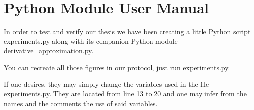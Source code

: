 \section{Python Module User Manual}

In order to test and verify our thesis we have been creating
a little Python script experiments.py along with its
companion Python module derivative\_approximation.py.

You can recreate all those figures in our protocol, just run experiments.py.

If one desires, they may simply change the variables used in the file experiments.py.
They are located from line 13 to 20 and one may infer from the names and the comments the
use of said variables.